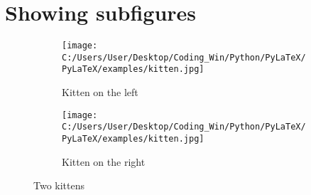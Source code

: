 \documentclass{article}%
\begin{document}
%
\normalsize%
\section{Showing subfigures}%
\label{sec:Showingsubfigures}%


\begin{figure}[h!]%
\begin{subfigure}[b]{0.45\linewidth}%
\texttt{[image: C:/Users/User/Desktop/Coding\_Win/Python/PyLaTeX/PyLaTeX/examples/kitten.jpg]}%
\caption{Kitten on the left}%
\end{subfigure}%
\begin{subfigure}[b]{0.45\linewidth}%
\texttt{[image: C:/Users/User/Desktop/Coding\_Win/Python/PyLaTeX/PyLaTeX/examples/kitten.jpg]}%
\caption{Kitten on the right}%
\end{subfigure}%
\caption{Two kittens}%
\end{figure}

%
\end{document}
